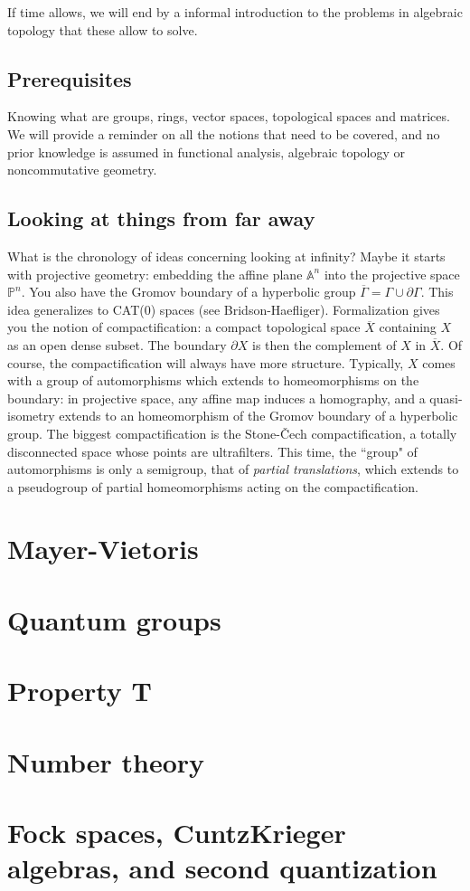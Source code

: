 If time allows, we will end by a informal introduction to the problems in algebraic topology that these allow to solve.  

\subsection*{Prerequisites}

Knowing what are groups, rings, vector spaces, topological spaces and matrices. We will provide a reminder on all the notions that need to be covered, and no prior knowledge is assumed in functional analysis, algebraic topology or noncommutative geometry.

\subsection*{Looking at things from far away}

What is the chronology of ideas concerning looking at infinity? Maybe it starts with projective geometry: embedding the affine plane $\mathbb A^n$ into the projective space $\mathbb P^n$. You also have the Gromov boundary of a hyperbolic group $\overline \Gamma = \Gamma \cup \partial \Gamma$. This idea generalizes to CAT(0) spaces (see Bridson-Haefliger). Formalization gives you the notion of compactification: a compact topological space $\overline X$ containing $X$ as an open dense subset. The boundary $\partial X$ is then the complement of $X$ in $\overline X$. Of course, the compactification will always have more structure. Typically, $X$ comes with a group of automorphisms which extends to homeomorphisms on the boundary: in projective space, any affine map induces a homography, and a quasi-isometry extends to an homeomorphism of the Gromov boundary of a hyperbolic group. The biggest compactification is the Stone-\v{C}ech compactification, a totally disconnected space whose points are ultrafilters. This time, the ``group" of automorphisms is only a semigroup, that of \textit{partial translations}, which extends to a pseudogroup of partial homeomorphisms acting on the compactification.   
\newpage

\section{Mayer-Vietoris}

\section{Quantum groups}

\section{Property T}

\section{Number theory}

\section{Fock spaces, CuntzKrieger algebras, and second quantization}












